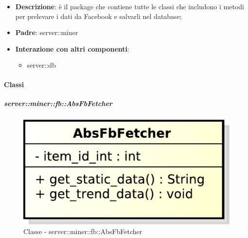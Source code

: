 \begin{itemize}
  \item \textbf{Descrizione}: è il package che contiene tutte le classi che includono i metodi per prelevare i dati da Facebook e salvarli nel database;
  \item \textbf{Padre}: server::miner
  \item \textbf{Interazione con altri componenti}:
  	\begin{itemize}
  		\item server::db
  	\end{itemize}
\end{itemize}

	\paragraph{Classi} %
		\subparagraph{server::miner::fb::AbsFbFetcher} %
		\label{subp:server_miner_fb_AbsFbFetcher}
		    \begin{figure}[!htbp]
 		 		\centering
 				\centerline{\includegraphics[scale=0.75]{./images/server/classes/miner/abs_fb_fetcher.pdf}}
 				\caption{Classe - server::miner::fb::AbsFbFetcher}
			\end{figure}
